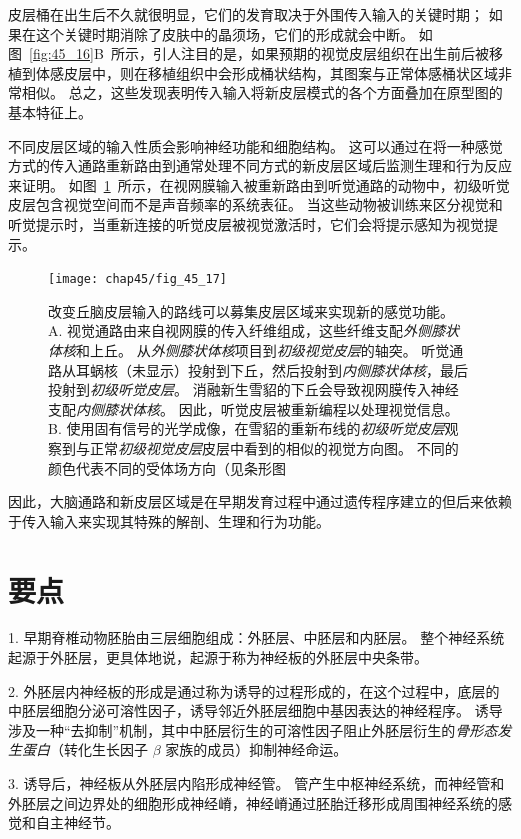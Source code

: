 皮层桶在出生后不久就很明显，它们的发育取决于外围传入输入的关键时期；
如果在这个关键时期消除了皮肤中的晶须场，它们的形成就会中断。
如图~\ref{fig:45_16}B~所示，引人注目的是，如果预期的视觉皮层组织在出生前后被移植到体感皮层中，则在移植组织中会形成桶状结构，其图案与正常体感桶状区域非常相似。
总之，这些发现表明传入输入将新皮层模式的各个方面叠加在原型图的基本特征上。


不同皮层区域的输入性质会影响神经功能和细胞结构。
这可以通过在将一种感觉方式的传入通路重新路由到通常处理不同方式的新皮层区域后监测生理和行为反应来证明。
如图~\ref{fig:45_17}~所示，在视网膜输入被重新路由到听觉通路的动物中，初级听觉皮层包含视觉空间而不是声音频率的系统表征。
当这些动物被训练来区分视觉和听觉提示时，当重新连接的听觉皮层被视觉激活时，它们会将提示感知为视觉提示。


\begin{figure}[htbp]
	\centering
	\texttt{[image: chap45/fig\_45\_17]}
	\caption{改变丘脑皮层输入的路线可以募集皮层区域来实现新的感觉功能\cite{sharma2000induction}。
		A. 视觉通路由来自视网膜的传入纤维组成，这些纤维支配\textit{外侧膝状体核}和上丘。
		从\textit{外侧膝状体核}项目到\textit{初级视觉皮层}的轴突。
		听觉通路从耳蜗核（未显示）投射到下丘，然后投射到\textit{内侧膝状体核}，最后投射到\textit{初级听觉皮层}。
		消融新生雪貂的下丘会导致视网膜传入神经支配\textit{内侧膝状体核}。
		因此，听觉皮层被重新编程以处理视觉信息。
		B. 使用固有信号的光学成像，在雪貂的重新布线的\textit{初级听觉皮层}观察到与正常\textit{初级视觉皮层}皮层中看到的相似的视觉方向图。
		不同的颜色代表不同的受体场方向（见条形图}
	\label{fig:45_17}
\end{figure}


因此，大脑通路和新皮层区域是在早期发育过程中通过遗传程序建立的但后来依赖于传入输入来实现其特殊的解剖、生理和行为功能。



\section{要点}

1. 早期脊椎动物胚胎由三层细胞组成：外胚层、中胚层和内胚层。
整个神经系统起源于外胚层，更具体地说，起源于称为神经板的外胚层中央条带。


2. 外胚层内神经板的形成是通过称为诱导的过程形成的，在这个过程中，底层的中胚层细胞分泌可溶性因子，诱导邻近外胚层细胞中基因表达的神经程序。
诱导涉及一种“去抑制”机制，其中中胚层衍生的可溶性因子阻止外胚层衍生的\textit{骨形态发生蛋白}（转化生长因子 $\beta$ 家族的成员）抑制神经命运。


3. 诱导后，神经板从外胚层内陷形成神经管。
管产生中枢神经系统，而神经管和外胚层之间边界处的细胞形成神经嵴，神经嵴通过胚胎迁移形成周围神经系统的感觉和自主神经节。


